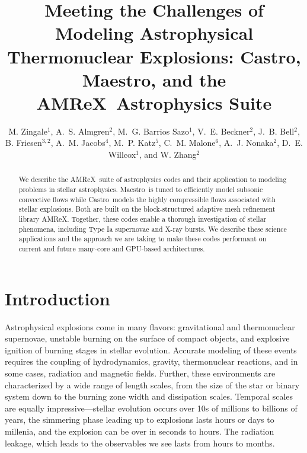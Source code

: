 \documentclass[a4paper]{jpconf}
\newcommand{\maestro}{{\sffamily Maestro}}
\newcommand{\castro}{{\sffamily Castro}}
\newcommand{\amrex}{{\sffamily AMReX}}
\begin{document}
\title{Meeting the Challenges of Modeling Astrophysical Thermonuclear Explosions:
\castro, \maestro, and the \amrex\ Astrophysics Suite}

\author{M. Zingale$^1$,
        A.~S. Almgren$^2$,
        M.~G. Barrios Sazo$^1$,
        V.~E. Beckner$^2$,
        J.~B. Bell$^2$,
        B. Friesen$^{3,2}$,
        A.~M. Jacobs$^4$,
        M.~P. Katz$^5$,
        C.~M. Malone$^6$,
        A.~J. Nonaka$^2$,
        D.~E. Willcox$^1$, and
        W. Zhang$^2$}

\address{$^1$Department of Physics and Astronomy, Stony Brook
  University, Stony Brook, NY 11794-3800 USA}

\address{$^2$Center for Computational Sciences and Engineering,
  Lawrence Berkeley National Lab, Berkeley, CA 94720 USA}

\address{$^3$National Energy Research Scientific Computing Center,
  Lawrence Berkeley National Lab, Berkeley, CA 94720 USA}

\address{$^4$Department of Physics and Astronomy, Michigan State
  University, East Lansing, Michigan 48824 USA}

\address{$^5$NVIDIA Corporation, 2788 San Tomas Expressway,
  Santa Clara, CA, 95050 USA}

\address{$^6$Los Alamos National Laboratory, Los Alamos, NM, 87545 USA}

\begin{abstract}
We describe the \amrex\ suite of astrophysics codes and their
application to modeling problems in stellar astrophysics.
\maestro\ is tuned to efficiently model subsonic convective flows
while \castro\ models the highly compressible flows associated with
stellar explosions.  Both are built on the block-structured adaptive
mesh refinement library \amrex.  Together, these codes enable a
thorough investigation of stellar phenomena, including Type Ia
supernovae and X-ray bursts.  We describe these science applications
and the approach we are taking to make these codes performant on
current and future many-core and GPU-based architectures.
\end{abstract}




\section{Introduction}

Astrophysical explosions come in many flavors: gravitational and
thermonuclear supernovae, unstable burning on the surface of compact
objects, and explosive ignition of burning stages in stellar
evolution.  Accurate modeling of these events requires the coupling of
hydrodynamics, gravity, thermonuclear reactions, and in some cases,
radiation and magnetic fields.  Further, these environments are
characterized by a wide range of length scales, from the size of the
star or binary system down to the burning zone width and dissipation
scales.  Temporal scales are equally impressive---stellar evolution
occurs over 10s of millions to billions of years, the simmering phase
leading up to explosions lasts hours or days to millenia, and the
explosion can be over in seconds to hours.  The radiation leakage,
which leads to the observables we see lasts from hours to months.
\end{document}
